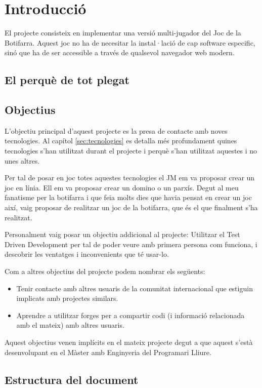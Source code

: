 \chapter{Introducció}

El projecte consisteix en implementar una versió multi-jugador del Joc de la Botifarra. Aquest joc no ha de necesitar la instal·lació de cap software especific, sinó que ha de ser accessible a través de qualsevol navegador web modern.

\section{El perquè de tot plegat}

\section{Objectius}
L'objectiu principal d'aquest projecte es la presa de contacte amb noves tecnologies. Al capítol \ref{sec:tecnologies} es detalla més profundament quines tecnologies s'han utilitzat durant el projecte i perquè s'han utilitzat aquestes i no unes altres. 

Per tal de posar en joc totes aquestes tecnologies el JM em va proposar crear un joc en línia. Ell em va proposar crear un domino o un parxís. Degut al meu fanatisme per la botifarra i que feia molts dies que havia pensat en crear un joc així, vaig proposar de realitzar un joc de la botifarra, que és el que finalment s'ha realitzat. 

Personalment vaig posar un objectiu addicional al projecte: Utilitzar el Test Driven Development per tal de poder veure amb primera persona com funciona, i descobrir les ventatges i inconvenients que té usar-lo. 

Com a altres objectius del projecte podem nombrar els següents: 
\begin{itemize}
	\item{Tenir contacte amb altres usuaris de la comunitat internacional que estiguin implicats amb projectes similars.}
	\item{Aprendre a utilitzar forges per a compartir codi (i informació relacionada amb el mateix) amb altres usuaris.}
\end{itemize} 

Aquest objectius venen implícits en el mateix projecte degut a que aquest s'està desenvolupant en el Màster amb Enginyeria del Programari Lliure. 

\section{Estructura del document}

